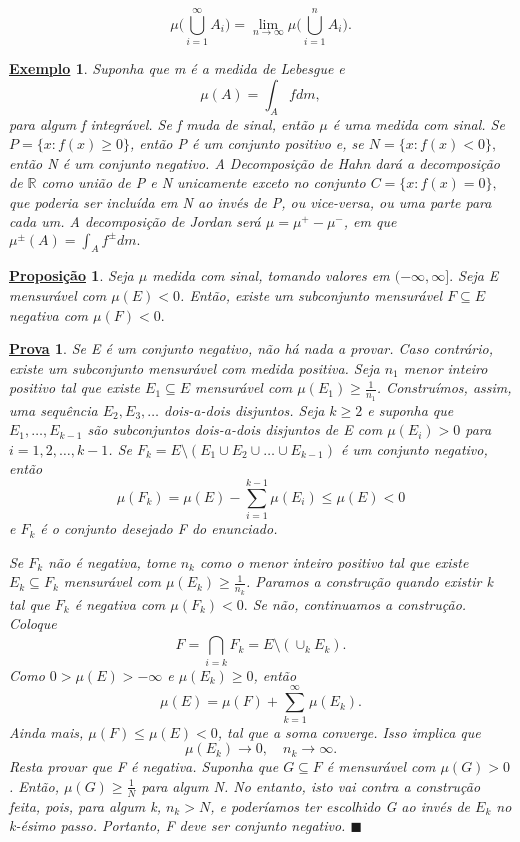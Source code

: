 \documentclass{article}
\newtheorem*{prop*}{\underline{Proposi\c c\~ao}}
\newtheorem{example}{\underline{Exemplo}}
\newtheorem*{proof*}{\underline{Prova}}
\renewcommand\qedsymbol{$\blacksquare$}
\begin{document}
    \[
      \mu \biggl(\bigcup_{i=1}^{\infty}A_{i}\biggr) = \lim_{n\to \infty}\mu \biggl(\bigcup_{i=1}^{n}A_{i}\biggr).
    \]
 \begin{example}
   Suponha que m é a medida de Lebesgue e 
     \[
       \mu (A) = \int_{A}f dm,
     \]
  para algum f integrável. Se f muda de sinal, então \(\mu \) é uma medida com sinal.
  Se \(P = \{x: f(x)\geq 0  \}\), então P é um conjunto positivo e, se \(N = \{x:f(x)<0\},\) então N é um conjunto negativo. A Decomposição de Hahn dará a decomposição de \(\mathbb{R}\) como união de P e N unicamente exceto no conjunto \(C = \{x: f(x) = 0\},\) que 
poderia ser incluída em N ao invés de P, ou vice-versa, ou uma parte para cada um. A decomposição de Jordan será \(\mu  = \mu ^{+} - \mu ^{-}\), em que \(\mu ^{\pm}(A) = \int_{A}f^{\pm} dm.\)
 \end{example}
 \begin{prop*}
   Seja \(\mu \) medida com sinal, tomando valores em \((-\infty, \infty].\) Seja E mensurável com \(\mu(E) < 0\). Então, existe um subconjunto mensurável \(F\subseteq E\) negativa com \(\mu (F) < 0.\)
 \end{prop*}
\begin{proof*}
  Se E é um conjunto negativo, não há nada a provar. Caso contrário, existe um subconjunto mensurável com medida positiva. Seja \(n_1\) menor inteiro positivo tal que existe \(E_1\subseteq E\) mensurável com 
  \(\mu (E_1)\geq \frac{1}{n_1}\). Construímos, assim, uma sequência \(E_2, E_3, \dotsc \) dois-a-dois disjuntos. Seja \(k\geq 2\) e suponha que \(E_1, \dotsc , E_{k-1}\) são subconjuntos dois-a-dois disjuntos de E com 
  \(\mu (E_{i}) > 0\) para \(i=1, 2, \dotsc , k-1\). Se \(F_{k}=E\setminus{(E_1\cup E_2\cup \dotsc \cup E_{k-1})}\) é um conjunto negativo, então 
    \[
      \mu (F_{k}) = \mu (E) - \sum\limits_{i=1}^{k-1}\mu (E_{i}) \leq \mu (E) < 0
    \]
  e \(F_{k}\) é o conjunto desejado F do enunciado.

  Se \(F_{k}\) não é negativa, tome \(n_{k}\) como o menor inteiro positivo tal que existe \(E_{k}\subseteq F_{k}\) mensurável com \(\mu (E_{k})\geq \frac{1}{n_{k}}\). 
Paramos a construção quando existir k tal que \(F_{k}\) é negativa com \(\mu (F_{k}) < 0.\) Se não, continuamos a construção. Coloque 
  \[
    F= \bigcap_{i=k}^{}F_{k} = E\setminus{(\cup _k E_{k})}.
  \]
  Como \(0 > \mu (E) > -\infty\) e \(\mu (E_{k})\geq 0\), então 
    \[
      \mu (E) = \mu (F) + \sum\limits_{k=1}^{\infty}\mu (E_{k}).
    \]
  Ainda mais, \(\mu (F) \leq \mu (E) < 0\), tal que a soma converge. Isso implica que 
    \[
      \mu (E_{k})\to 0,\quad n_{k}\to \infty.
    \]
  Resta provar que F é negativa. Suponha que \(G\subseteq F\) é mensurável com \(\mu (G) > 0\). Então, \(\mu (G) \geq \frac{1}{N}\) para algum N. No entanto, isto vai contra a construção feita, pois, para algum k, \(n_{k}> N\), e poderíamos ter escolhido
G ao invés de \(E_{k}\) no k-ésimo passo. Portanto, F deve ser conjunto negativo. \qedsymbol
\end{proof*}
\end{document}
